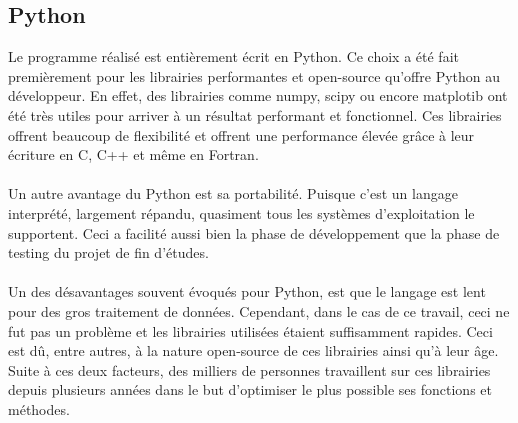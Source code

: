 \documentclass[11pt]{article}
\begin{document}
\subsection{Python}

Le programme réalisé est entièrement écrit en Python.
Ce choix a été fait premièrement pour les librairies performantes et open-source qu'offre Python au développeur.
En effet, des librairies comme numpy, scipy ou encore matplotib ont été très utiles pour arriver à un résultat performant et fonctionnel.
Ces librairies offrent beaucoup de flexibilité et offrent une performance élevée grâce à leur écriture en C, C++ et même en Fortran.\\
\\
Un autre avantage du Python est sa portabilité.
Puisque c'est un langage interprété, largement répandu, quasiment tous les systèmes d'exploitation le supportent.
Ceci a facilité aussi bien la phase de développement que la phase de testing du projet de fin d'études.\\
\\
Un des désavantages souvent évoqués pour Python, est que le langage est lent pour des gros traitement de données.
Cependant, dans le cas de ce travail, ceci ne fut pas un problème et les librairies utilisées étaient suffisamment rapides.
Ceci est dû, entre autres, à la nature open-source de ces librairies ainsi qu'à leur âge.
Suite à ces deux facteurs, des milliers de personnes travaillent sur ces librairies depuis plusieurs années dans le but d'optimiser le plus possible ses fonctions et méthodes.

\end{document}
